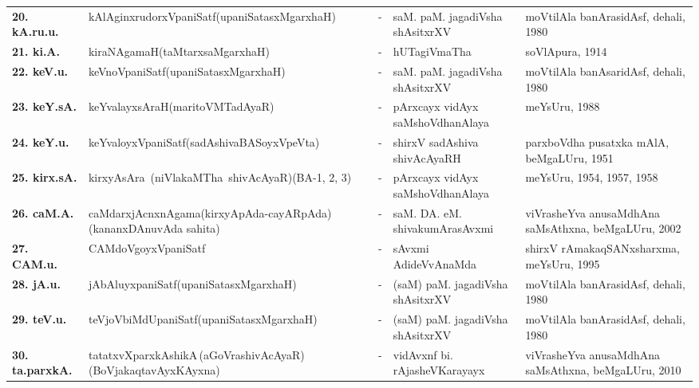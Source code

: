 {\begin{longtable}{lp{5cm}cp{5cm}<{\raggedright}p{3cm}<{\raggedright}@{}}
{\bf 20. kA.ru.u.} & kAlAginxrudorxVpaniSatf\newline (upaniSatasxMgarxhaH) &-& saM. paM. jagadiVsha shAsitxrXV & moVtilAla banArasidAsf, dehali, 1980\\
{\bf 21. ki.A.} & kiraNAgamaH\newline (taMtarxsaMgarxhaH) &-& hUTagiVmaTha & soVlApura, 1914\\
{\bf 22. keV.u.} & keVnoVpaniSatf\newline (upaniSatasxMgarxhaH) &-& saM. paM. jagadiVsha shAsitxrXV & moVtilAla banAsaridAsf, dehali, 1980\\
{\bf 23. keY.sA.} & keYvalayxsAraH\newline (maritoVMTadAyaR) &-& pArxcayx vidAyx saMshoVdhanAlaya & meYsUru, 1988\\
{\bf 24. keY.u.} & keYvaloyxVpaniSatf\newline (sadAshivaBASoyxVpeVta) &-& shirxV sadAshiva shivAcAyaRH & parxboVdha pusatxka mAlA, beMgaLUru, 1951\\
{\bf 25. kirx.sA.} & \hbox{kirxyAsAra (niVlakaMTha shivAcAyaR)}\newline (BA-1, 2, 3) &-& pArxcayx vidAyx saMshoVdhanAlaya & meYsUru, 1954, 1957, 1958\\
{\bf 26. caM.A.} & caMdarxjAcnxnAgama\newline (kirxyApAda-cayARpAda)\newline (kananxDAnuvAda sahita) &-& saM. DA. eM. shivakumArasAvxmi & viVrasheYva anusaMdhAna saMsAthxna, beMgaLUru, 2002\\
{\bf 27. CAM.u.} & CAMdoVgoyxVpaniSatf &-& sAvxmi AdideVvAnaMda & shirxV rAmakaqSANxsharxma, meYsUru, 1995\\
{\bf 28. jA.u.} & jAbAluyxpaniSatf\newline (upaniSatasxMgarxhaH) &-& (saM) paM. jagadiVsha shAsitxrXV & moVtilAla banArasidAsf, dehali, 1980\\
{\bf 29. teV.u.} & teVjoVbiMdUpaniSatf\newline (upaniSatasxMgarxhaH) &-& (saM) paM. jagadiVsha shAsitxrXV & moVtilAla banArasidAsf, dehali, 1980\\
{\bf 30. ta.parxkA.} & tatatxvXparxkAshikA\,(aGoVrashivAcAyaR)\newline (BoVjakaqtavAyxKAyxna) &-& vidAvxnf bi. rAjasheVKarayayx & viVrasheYva anusaMdhAna saMsAthxna, beMgaLUru, 2010\\

\end{longtable}}
